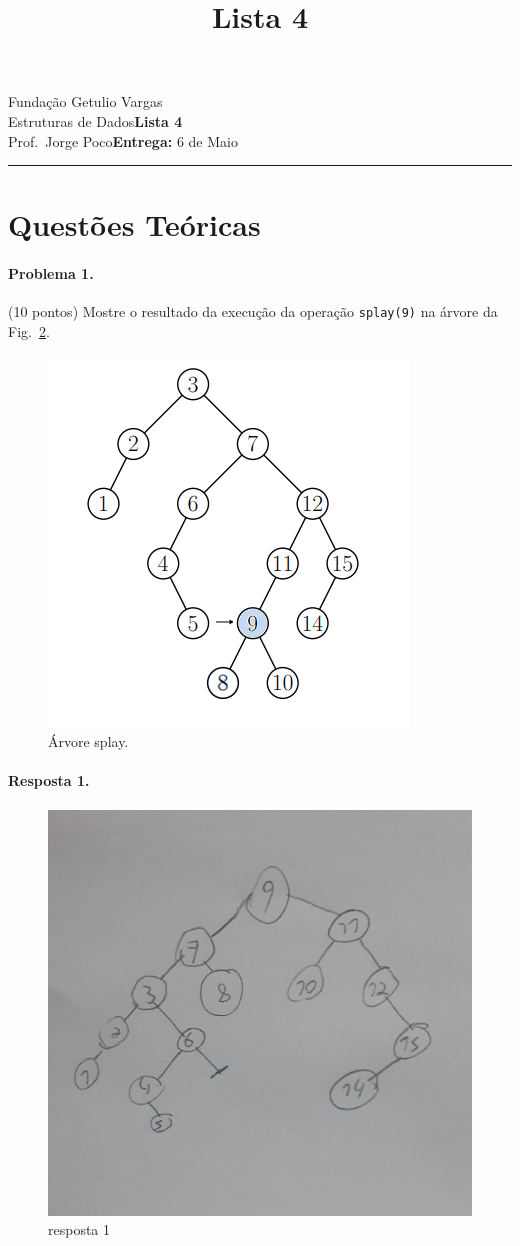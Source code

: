\documentclass{article}
\title{Lista 4}
\date{}
\newcommand{\assignment}{Lista 4}
\newcommand{\duedate}{6 de Maio}
\begin{document}
Fundação Getulio Vargas\hfill\\
Estruturas de Dados\hfill\textbf{\assignment}\\
Prof.\ Jorge Poco\hfill\textbf{Entrega:} \duedate\\
\smallskip\hrule\bigskip

{\let\newpage\relax\maketitle}
\maketitle

\section{Questões Teóricas}

\paragraph{Problema 1.} (10 pontos)
Mostre o resultado da execução da operação \texttt{splay(9)} na árvore da Fig.~\ref{fig:prob1}.

\begin{figure}[h]
    \centering
    \includegraphics[width = 0.4\linewidth]{figs/fig1.png}
    \caption{Árvore splay.}
    \label{fig:prob1}
\end{figure}

\paragraph{Resposta 1.}
\begin{figure}[h]
    \centering
    \includegraphics[width = 0.4\linewidth]{figs/fig3.png}
    \caption{resposta 1}
    \label{fig:prob1}
\end{figure}
\end{document}

